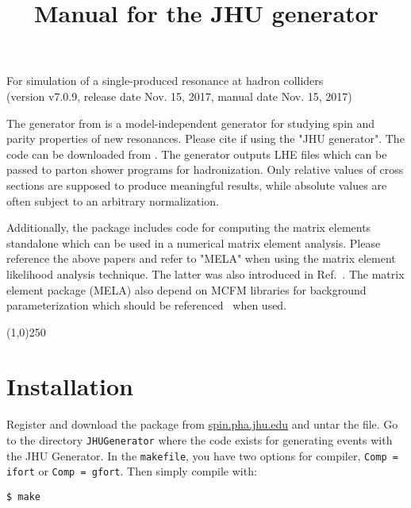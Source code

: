 \documentclass[aps,superscriptaddress,nofootinbib]{revtex4}
\begin{document}
\vspace{0.6cm}

\title{
\large
Manual for the JHU generator
}
\maketitle
\begin{center}
\small
For simulation of a single-produced resonance at hadron colliders \\
(version v7.0.9, release date Nov. 15, 2017, manual date Nov. 15, 2017) \\
\normalsize
\end{center}

\noindent
The generator from \cite{Gao:2010qx,Bolognesi:2012,Anderson:2013,Gritsan:2016} is a model-independent generator for studying spin and parity properties of new resonances.
Please cite \cite{Gao:2010qx,Bolognesi:2012,Anderson:2013,Gritsan:2016} if using the "JHU generator".
The code can be downloaded from \cite{thesite}.
The generator outputs LHE files which can be passed to parton shower programs for hadronization.
Only relative values of cross sections are supposed to produce meaningful results, while absolute values are often subject to an arbitrary normalization.

Additionally, the package includes code for computing the matrix elements standalone which can be used in a numerical matrix element analysis.
Please reference the above papers and refer to "MELA" when using the matrix element likelihood analysis technique.
The latter was also introduced in Ref.~\cite{Chatrchyan:2012ufa}. The matrix element package (MELA) also depend on MCFM libraries for background parameterization which should be referenced~\cite{Campbell:2010ff} when used.

\vspace{0.5cm}
\begin{center}
\line(1,0){250}
\end{center}
\vspace{0.5cm}
\tableofcontents
\begin{center}
\end{center}
\vspace{0.5cm}


\section{Installation}

\noindent
Register and download the package from \url{spin.pha.jhu.edu} and untar the file.  Go to the directory \verb|JHUGenerator| where the code exists for generating events with the JHU Generator. In the \verb|makefile|, you have two options for compiler, \verb|Comp = ifort| or \verb|Comp = gfort|.  Then simply compile with:
\begin{verbatim}
$ make
\end{verbatim}
\end{document}
